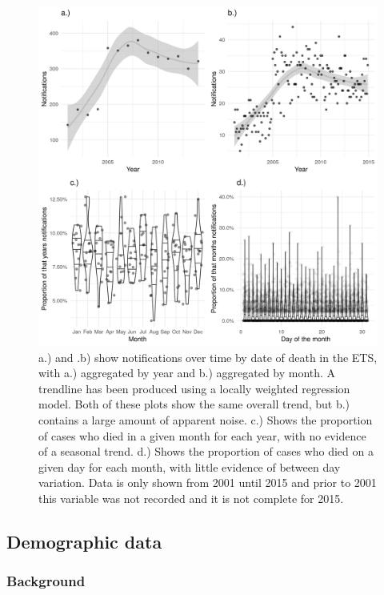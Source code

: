 \documentclass[11pt,twoside]{bristolthesis}
\begin{document}
  \begin{figure}
  
  {\centering \includegraphics[width=0.8\linewidth]{chapters/tb-epi-england/figures/plot-detection-dateofdeath} 
  
  }
  
  \caption{a.) and .b) show notifications over time by date of death in the ETS, with a.) aggregated by year and  b.) aggregated by month. A trendline has been produced using a locally weighted regression model. Both of these plots show the same overall trend, but b.) contains a large amount of apparent noise. c.) Shows the proportion of cases who died in a given month for each year, with no evidence of a seasonal trend. d.) Shows the proportion of cases who died on a given day for each month, with little evidence of between day variation. Data is only shown from 2001 until 2015 and prior to 2001 this variable was not recorded and it is not complete for 2015.}\label{fig:plot-detection-dateofdeath}
  \end{figure}
  \hypertarget{demographic-data}{%
  \subsection{Demographic data}\label{demographic-data}}
  
  \hypertarget{background-2}{%
  \subsubsection{Background}\label{background-2}}
  
\end{document}
